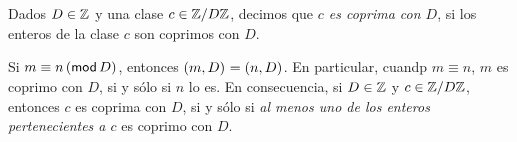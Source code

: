 
\begin{defGeneros}\label{def:generos:clases-coprimas}
	Dados $D\in\Enteros$ y una clase $c\in\Enterosmod[D]$, decimos
	que \emph{$c$ es coprima con $D$}, si los enteros de la clase
	$c$ son coprimos con $D$.
\end{defGeneros}

\begin{obsGeneros}\label{obs:generos:clases-coprimas}
	Si $m\equiv n\tmodulo[D]$, entonces $\mcd{m,D}=\mcd{n,D}$.
	En particular, cuandp $m\equiv n$, $m$ es coprimo con $D$, si
	y s\'olo si $n$ lo es. En consecuencia,
	si $D\in\Enteros$ y $c\in\Enterosmod[D]$, entonces $c$ es coprima
	con $D$, si y s\'olo si \emph{al menos uno de los enteros %
	pertenecientes a $c$} es coprimo con $D$.
\end{obsGeneros}
